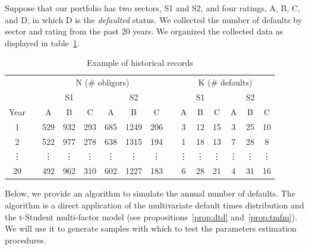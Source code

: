 \documentclass[11pt,fleqn]{book} %
\begin{document}
\begin{example}[]
	Suppose that our portfolio has two sectors, S1 and S2, and four ratings, 
	A, B, C, and D, in which D is the \emph{defaulted} status. We collected 
	the number of defaults by sector and rating from the past 20 years. We 
	organized the collected data as displayed in table~\ref{table:histdata}.
	\begin{table}[!ht]
		\centering
		\begin{tabular}{cc|c|c|c||c|c|c|  c  |c|c|c||c|c|c|}
			\cline{3-8} \cline{10-15}
			& & \multicolumn{6}{|c|}{N (\# obligors)} & & \multicolumn{6}{|c|}{K (\# defaults)} \\
			\cline{3-8} \cline{10-15}
			& & \multicolumn{3}{|c||}{S1} & \multicolumn{3}{|c|}{S2} & & \multicolumn{3}{|c||}{S1} & \multicolumn{3}{|c|}{S2} \\
			\cline{1-1} \cline{3-8} \cline{10-15}
			\multicolumn{1}{|c|}{Year} & & A & B & C & A & B & C & & A & B & C & A & B & C \\
			\cline{1-1} \cline{3-8} \cline{10-15}
			\multicolumn{1}{|c|}{1} & & 529 & 932 & 293 & 685 & 1249 & 206 & & 3 & 12 & 15 & 3 & 25 & 10 \\
			\cline{1-1} \cline{3-8} \cline{10-15}
			\multicolumn{1}{|c|}{2} & & 522 & 977 & 278 & 638 & 1315 & 194 & & 1 & 18 & 13 & 7 & 28 & 8 \\
			\cline{1-1} \cline{3-8} \cline{10-15}
			\multicolumn{1}{|c|}{\vdots} & & \vdots & \vdots & \vdots & \vdots & \vdots & \vdots & & \vdots & \vdots & \vdots & \vdots & \vdots & \vdots \\
			\cline{1-1} \cline{3-8} \cline{10-15}
			\multicolumn{1}{|c|}{20} & & 492 & 962 & 310 & 602 & 1227 & 183 & & 6 & 28 & 21 & 4 & 31 & 16 \\
			\cline{1-1} \cline{3-8} \cline{10-15}
		\end{tabular}
		\caption{Example of historical records}
		\label{table:histdata}
	\end{table}
\end{example}

Below, we provide an algorithm to simulate the annual number of defaults. The 
algorithm is a direct application of the multivariate default times distribution
and the t-Student multi-factor model (see propositions~\ref{prop:dtd} 
and~\ref{prop:tmfm}). We will use it to generate samples with which to 
test the parameters estimation procedures. 
\end{document}
